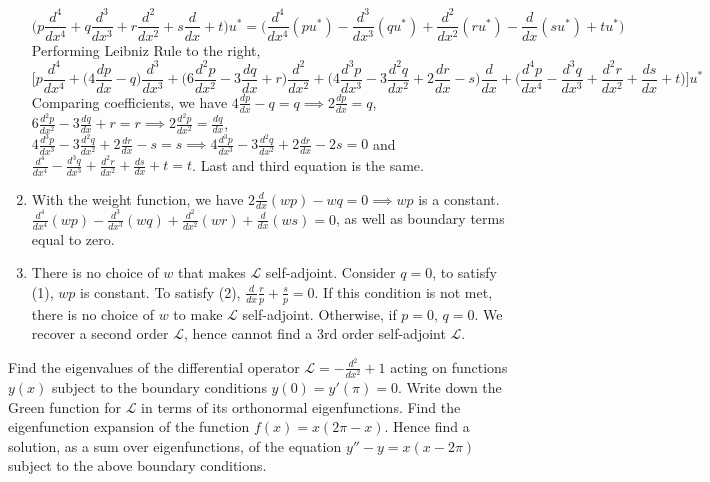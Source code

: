 \documentclass[a4paper]{article}
\begin{document}
\begin{ans}
\begin{enumerate}[label=(\roman*)]
$$\bigg(p\frac{d^4}{dx^4}+q\frac{d^3}{dx^3}+r\frac{d^2}{dx^2}+s\frac{d}{dx}+t\bigg)u^*=\bigg(\frac{d^4}{dx^4}(pu^*)-\frac{d^3}{dx^3}(qu^*)+\frac{d^2}{dx^2}(ru^*)-\frac{d}{dx}(su^*)+tu^*\bigg)$$
Performing Leibniz Rule to the right,
$$\bigg[p\frac{d^4}{dx^4}+\bigg(4\frac{dp}{dx}-q\bigg)\frac{d^3}{dx^3}+\bigg(6\frac{d^2p}{dx^2}-3\frac{dq}{dx}+r\bigg)\frac{d^2}{dx^2}+\bigg(4\frac{d^3p}{dx^3}-3\frac{d^2q}{dx^2}+2\frac{dr}{dx}-s\bigg)\frac{d}{dx}+\bigg(\frac{d^4p}{dx^4}-\frac{d^3q}{dx^3}+\frac{d^2r}{dx^2}+\frac{ds}{dx}+t\bigg)\bigg]u^*$$
Comparing coefficients, we have $4\frac{dp}{dx}-q=q\implies 2\frac{dp}{dx}=q$, $6\frac{d^2p}{dx^2}-3\frac{dq}{dx}+r=r\implies2\frac{d^2p}{dx^2}=\frac{dq}{dx}$, $4\frac{d^3p}{dx^3}-3\frac{d^2q}{dx^2}+2\frac{dr}{dx}-s=s\implies 4\frac{d^3p}{dx^3}-3\frac{d^2q}{dx^2}+2\frac{dr}{dx}-2s=0$ and $\frac{d^4}{dx^4}-\frac{d^3q}{dx^3}+\frac{d^2r}{dx^2}+\frac{ds}{dx}+t=t$. Last and third equation is the same. \item With the weight function, we have $2\frac{d}{dx}(wp)-wq=0\implies wp$ is a constant. $\frac{d^4}{dx^4}(wp)-\frac{d^3}{dx^3}(wq)+\frac{d^2}{dx^2}(wr)+\frac{d}{dx}(ws)=0$, as well as boundary terms equal to zero.
\item There is no choice of $w$ that makes $\mathcal{L}$ self-adjoint. Consider $q=0$, to satisfy (1), $wp$ is constant. To satisfy (2), $\frac{d}{dx}\frac{r}{p}+\frac{s}{p}=0$. If this condition is not met, there is no choice of $w$ to make $\mathcal{L}$ self-adjoint. Otherwise, if $p=0$, $q=0$. We recover a second order $\mathcal{L}$, hence cannot find a 3rd order self-adjoint $\mathcal{L}$.
\end{enumerate}
\end{ans}
\begin{qns}
Find the eigenvalues of the differential operator $\mathcal{L}=-\frac{d^2}{dx^2}+1$ acting on functions $y(x)$ subject to the boundary conditions $y(0)=y'(\pi)=0$. Write down the Green function for $\mathcal{L}$ in terms of its orthonormal eigenfunctions. Find the eigenfunction expansion of the function $f(x)=x(2\pi -x)$. Hence find a solution, as a sum over eigenfunctions, of the equation $y''-y=x(x-2\pi)$ subject to the above boundary conditions.
\end{qns}
\end{document}
